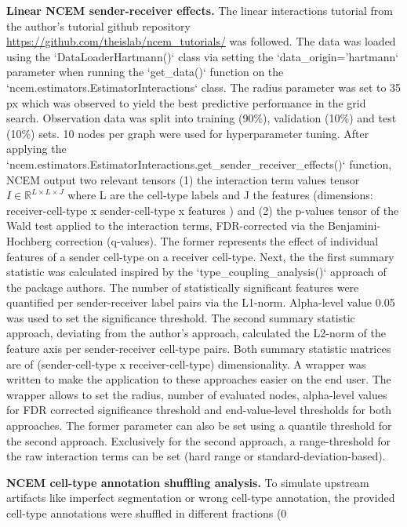 \textbf{Linear NCEM sender-receiver effects.} The linear interactions tutorial from the author's tutorial github repository \url{https://github.com/theislab/ncem_tutorials/} was followed. The data was loaded using the `DataLoaderHartmann()` class via setting the `data\_origin='hartmann` parameter when running the `get\_data()` function on the `ncem.estimators.EstimatorInteractions` class. The radius parameter was set to 35 px which was observed to yield the best predictive performance in the grid search. Observation data was split into training (90\%), validation (10\%) and test (10\%) sets. 10 nodes per graph were used for hyperparameter tuning. After applying the `ncem.estimators.EstimatorInteractions.get\_sender\_receiver\_effects()` function, NCEM output two relevant tensors (1) the interaction term values tensor $I \in \mathbb{R}^{L \times L \times J}$ where L are the cell-type labels and J the features (dimensions: receiver-cell-type x sender-cell-type x features ) and (2) the p-values tensor of the Wald test applied to the interaction terms, FDR-corrected via the Benjamini-Hochberg correction (q-values). The former represents the effect of individual features of a sender cell-type on a receiver cell-type. Next, the the first summary statistic was calculated inspired by the `type\_coupling\_analysis()` approach of the package authors. The number of statistically significant features were quantified per sender-receiver label pairs via the L1-norm. Alpha-level value 0.05 was used to set the significance threshold. The second summary statistic approach, deviating from the author's approach, calculated the L2-norm of the feature axis per sender-receiver cell-type pairs. Both summary statistic matrices are of (sender-cell-type x receiver-cell-type) dimensionality. A wrapper was written to make the application to these approaches easier on the end user. The wrapper allows to set the radius, number of evaluated nodes, alpha-level values for FDR corrected significance threshold and end-value-level thresholds for both approaches. The former parameter can also be set using a quantile threshold for the second approach. Exclusively for the second approach, a range-threshold for the raw interaction terms can be set (hard range or standard-deviation-based).

\textbf{NCEM cell-type annotation shuffling analysis.} To simulate upstream artifacts like imperfect segmentation or wrong cell-type annotation, the provided cell-type annotations were shuffled in different fractions (0%

